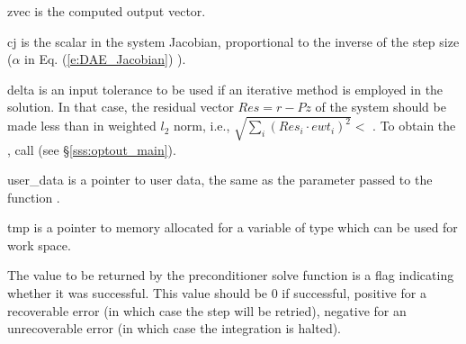 {{\begin{args}
  \item[zvec]
    is the computed output vector.
  \item[cj]
    is the scalar in the system Jacobian, proportional to the inverse of the
    step size ($\alpha$ in Eq. (\ref{e:DAE_Jacobian}) ).
  \item[delta]
    is an input tolerance to be used if an iterative method 
    is employed in the solution.  In that case, the residual 
    vector $Res = r - P z$ of the system should be made less than 
     in weighted $l_2$ norm,     
    i.e., $\sqrt{\sum_i (Res_i \cdot ewt_i)^2 } <$ .
    To obtain the  , call  
    (see \S\ref{sss:optout_main}).
  \item[user\_data]
    is a pointer to user data, the same as the       
    parameter passed to the function .
  \item[tmp]
    is a pointer to memory allocated for a variable of type    
     which can be used for work space.
  \end{args}
}
{
  The value to be returned by the preconditioner solve function is a flag
  indicating whether it was successful.  This value should be $0$ if successful, 
  positive for a recoverable error (in which case the step will be retried),     
  negative for an unrecoverable error (in which case the integration is halted). 
}
{}
}
